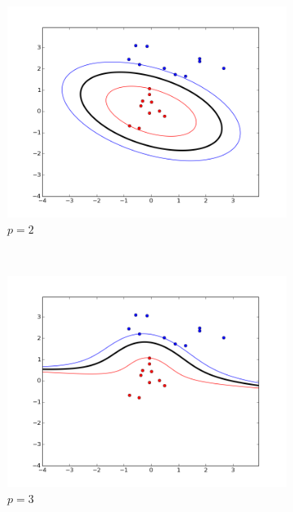 \documentclass{article}
\begin{document}
\begin{figure}[!h]
    \centering
    \begin{subfigure}[b]{0.3\textwidth}
        \includegraphics[width=1.2\textwidth]{images/pol/2/figure_2.png}
        \caption{$p = 2$} \label{polynomial_2_figure_1}
    \end{subfigure}
    ~ 
    \begin{subfigure}[b]{0.3\textwidth}
        \includegraphics[width=1.2\textwidth]{images/pol/2/figure_3.png}
        \caption{$p = 3$}  \label{polynomial_2_figure_2}
    \end{subfigure}
     ~ 
    \begin{subfigure}[b]{0.3\textwidth}

\end{subfigure}
\end{figure}
\end{document}

